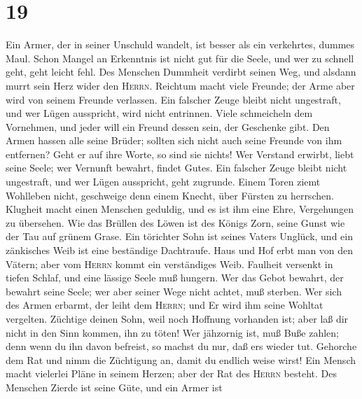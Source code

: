 \hypertarget{section-18}{%
\section{19}\label{section-18}}

 Ein Armer, der in seiner Unschuld wandelt, ist besser als
ein verkehrtes, dummes Maul.  Schon Mangel an Erkenntnis
ist nicht gut für die Seele, und wer zu schnell geht, geht leicht fehl.
 Des Menschen Dummheit verdirbt seinen Weg, und alsdann
murrt sein Herz wider den \textsc{Herrn}.  Reichtum macht
viele Freunde; der Arme aber wird von seinem Freunde verlassen.
 Ein falscher Zeuge bleibt nicht ungestraft, und wer Lügen
ausspricht, wird nicht entrinnen.  Viele schmeicheln dem
Vornehmen, und jeder will ein Freund dessen sein, der Geschenke gibt.
 Den Armen hassen alle seine Brüder; sollten sich nicht
auch seine Freunde von ihm entfernen? Geht er auf ihre Worte, so sind
sie nichts!  Wer Verstand erwirbt, liebt seine Seele; wer
Vernunft bewahrt, findet Gutes.  Ein falscher Zeuge bleibt
nicht ungestraft, und wer Lügen ausspricht, geht zugrunde.
 Einem Toren ziemt Wohlleben nicht, geschweige denn einem
Knecht, über Fürsten zu herrschen.  Klugheit macht einen
Menschen geduldig, und es ist ihm eine Ehre, Vergehungen zu übersehen.
 Wie das Brüllen des Löwen ist des Königs Zorn, seine
Gunst wie der Tau auf grünem Grase.  Ein törichter Sohn
ist seines Vaters Unglück, und ein zänkisches Weib ist eine beständige
Dachtraufe.  Haus und Hof erbt man von den Vätern; aber
vom \textsc{Herrn} kommt ein verständiges Weib.  Faulheit
versenkt in tiefen Schlaf, und eine lässige Seele muß hungern.
 Wer das Gebot bewahrt, der bewahrt seine Seele; wer aber
seiner Wege nicht achtet, muß sterben.  Wer sich des
Armen erbarmt, der leiht dem \textsc{Herrn}; und Er wird ihm seine
Wohltat vergelten.  Züchtige deinen Sohn, weil noch
Hoffnung vorhanden ist; aber laß dir nicht in den Sinn kommen, ihn zu
töten!  Wer jähzornig ist, muß Buße zahlen; denn wenn du
ihn davon befreist, so machst du nur, daß er\textquotesingle s wieder
tut.  Gehorche dem Rat und nimm die Züchtigung an, damit
du endlich weise wirst!  Ein Mensch macht vielerlei Pläne
in seinem Herzen; aber der Rat des \textsc{Herrn} besteht.
 Des Menschen Zierde ist seine Güte, und ein Armer ist
